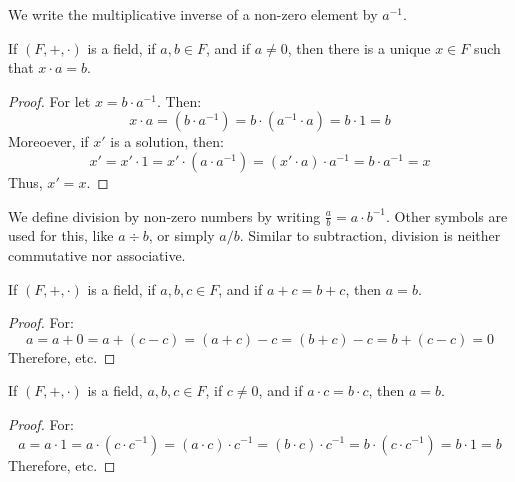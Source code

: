 \documentclass[crop=false,class=book,oneside]{standalone}
\begin{document}
            We write the multiplicative inverse of a non-zero element
            by $a^{\minus{1}}$.
            \begin{theorem}
                If $(F,+,\cdot)$ is a field, if $a,b\in{F}$, and if
                $a\ne{0}$, then there is a unique $x\in{F}$ such that
                $x\cdot{a}=b$.
            \end{theorem}
            \begin{proof}
                For let $x=b\cdot{a}^{\minus{1}}$. Then:
                \begin{equation}
                    x\cdot{a}=(b\cdot{a}^{\minus{1}})=
                    b\cdot(a^{\minus{1}}\cdot{a})=
                    b\cdot{1}=b
                \end{equation}
                Moreoever, if $x'$ is a solution, then:
                \begin{equation}
                    x'=x'\cdot{1}=x'\cdot(a\cdot{a^{\minus{1}}})
                    =(x'\cdot{a})\cdot{a^{\minus{1}}}=
                    b\cdot{a}^{\minus{1}}=x
                \end{equation}
                Thus, $x'=x$.
            \end{proof}
            We define division by non-zero numbers by writing
            $\frac{a}{b}=a\cdot{b}^{\minus{1}}$. Other symbols are
            used for this, like $a\div{b}$, or simply $a/b$. Similar
            to subtraction, division is neither commutative nor
            associative.
            \begin{theorem}
                If $(F,+,\cdot)$ is a field, if $a,b,c\in{F}$, and if
                $a+c=b+c$, then $a=b$.
            \end{theorem}
            \begin{proof}
                For:
                \begin{equation}
                    a=a+0=a+(c-c)=(a+c)-c=(b+c)-c=b+(c-c)=0
                \end{equation}
                Therefore, etc.
            \end{proof}
            \begin{theorem}
                If $(F,+,\cdot)$ is a field, $a,b,c\in{F}$, if
                $c\ne{0}$, and if $a\cdot{c}=b\cdot{c}$, then
                $a=b$.
            \end{theorem}
            \begin{proof}
                For:
                \begin{equation}
                    a=a\cdot{1}=a\cdot(c\cdot{c}^{\minus{1}})=
                    (a\cdot{c})\cdot{c}^{\minus{1}}=
                    (b\cdot{c})\cdot{c}^{\minus{1}}=
                    b\cdot(c\cdot{c}^{\minus{1}})=
                    b\cdot{1}=b
                \end{equation}
                Therefore, etc.
            \end{proof}
\end{document}
